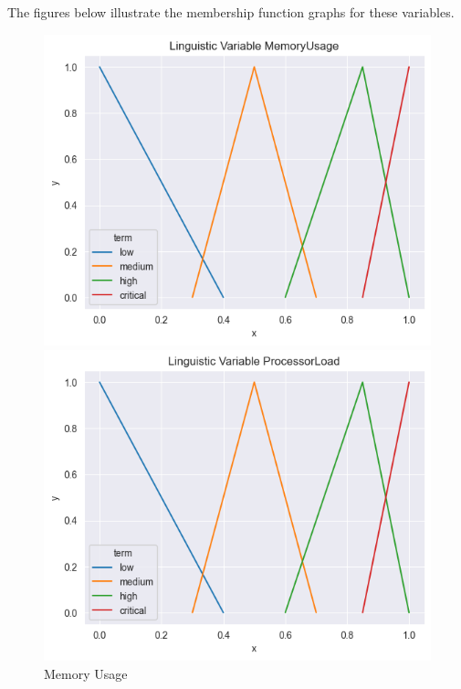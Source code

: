 \documentclass[titlepage]{article}
\begin{document}
The figures below illustrate the membership function graphs for these variables.

\begin{figure}[htbp]
    \centering
    \begin{minipage}{0.32\textwidth}
        \centering
        \includegraphics[width=\textwidth]{../images/triangular_MemoryUsage}
        \caption{Memory Usage}
        \label{fig:processor_load}
    \end{minipage}
    \hfill
    \begin{minipage}{0.32\textwidth}
        \centering
        \includegraphics[width=\textwidth]{../images/triangular_ProcessorLoad}

\end{minipage}
\end{figure}
\end{document}
